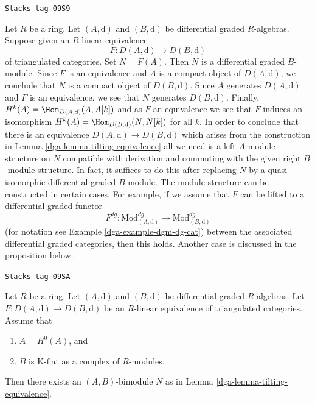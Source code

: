 \begin{remark}
\label{dga-remark-lift-equivalence-to-dga}
\href{https://stacks.math.columbia.edu/tag/09S9}{\texttt{Stacks tag 09S9}}

Let $R$ be a ring. Let $(A, \text{d})$ and $(B, \text{d})$ be differential
graded $R$-algebras. Suppose given an $R$-linear equivalence
$$
F : D(A, \text{d}) \longrightarrow D(B, \text{d})
$$
of triangulated categories. Set $N = F(A)$. Then $N$ is a differential
graded $B$-module. Since $F$ is an equivalence and $A$ is a compact
object of $D(A, \text{d})$, we conclude that $N$ is a compact object
of $D(B, \text{d})$. Since $A$ generates $D(A, \text{d})$ and
$F$ is an equivalence, we see that $N$ generates $D(B, \text{d})$.
Finally, $H^k(A) = \Hom_{D(A, \text{d})}(A, A[k])$ and as $F$ an equivalence
we see that $F$ induces an isomorphism
$H^k(A) = \Hom_{D(B, \text{d})}(N, N[k])$ for all $k$.
In order to conclude that there is an equivalence
$D(A, \text{d}) \longrightarrow D(B, \text{d})$ which
arises from the construction in
Lemma \ref{dga-lemma-tilting-equivalence}
all we need is a left $A$-module structure on $N$
compatible with derivation and commuting
with the given right $B$-module structure. In fact, it
suffices to do this after replacing $N$ by a quasi-isomorphic
differential graded $B$-module.
The module structure can be constructed in certain cases.
For example, if we assume that $F$ can be lifted to a
differential graded functor
$$
F^{dg} :
\text{Mod}^{dg}_{(A, \text{d})}
\longrightarrow
\text{Mod}^{dg}_{(B, \text{d})}
$$
(for notation see Example \ref{dga-example-dgm-dg-cat})
between the associated differential graded categories,
then this holds. Another case is discussed in the proposition below.
\end{remark}

\begin{proposition}[Rickard]
\label{dga-proposition-rickard}
\href{https://stacks.math.columbia.edu/tag/09SA}{\texttt{Stacks tag 09SA}}

Let $R$ be a ring. Let $(A, \text{d})$ and $(B, \text{d})$ be
differential graded $R$-algebras. Let $F : D(A, \text{d}) \to D(B, \text{d})$
be an $R$-linear equivalence of triangulated categories. Assume that
\begin{enumerate}
\item $A = H^0(A)$, and
\item $B$ is K-flat as a complex of $R$-modules.
\end{enumerate}
Then there exists an $(A, B)$-bimodule $N$ as in
Lemma \ref{dga-lemma-tilting-equivalence}.
\end{proposition}

